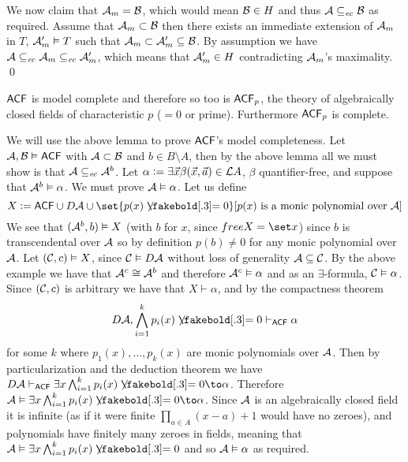 We now claim that ${\cal A}_m={\cal B}$, which would mean ${\cal B}\in H$ and thus ${\cal A}\subseteq_{\it ec}{\cal B}$ as required.
Assume that ${\cal A}_m\subset{\cal B}$ then there exists an immediate extension of ${\cal A}_m$ in $T$, ${\cal A}'_m\vDash T$ such that ${\cal A}_m\subset{\cal A}'_m\subseteq{\cal B}$.
By assumption we have ${\cal A}\subseteq_{\it ec}{\cal A}_m\subseteq_{\it ec}{\cal A}_m'$, which means that ${\cal A}_m'\in H$ contradicting ${\cal A}_m$'s maximality.
\qed

\bthrm

    ${\sf ACF}$ is model complete and therefore so too is ${\sf ACF}_p$, the theory of algebraically closed fields of characteristic $p$ ($=0$ or prime).
    Furthermore ${\sf ACF}_p$ is complete.

\ethrm

We will use the above lemma to prove ${\sf ACF}$'s model completeness.
Let ${\cal A},{\cal B}\vDash{\sf ACF}$ with ${\cal A}\subset{\cal B}$ and $b\in B\setminus A$, then by the above lemma all we must show is that ${\cal A}\subseteq_{\it ec}{\cal A}^b$.
Let $\alpha\coloneqq\exists\vec x\beta(\vec x,\vec a)\in{\cal L}A$, $\beta$ quantifier-free, and suppose that ${\cal A}^b\vDash\alpha$.
We must prove ${\cal A}\vDash\alpha$.
Let us define
$$ X \coloneqq {\sf ACF}\cup D{\cal A}\cup\set{p(x)\neqb0}[\hbox{$p(x)$ is a monic polynomial over ${\cal A}$}] $$
We see that $({\cal A}^b,b)\vDash X$ (with $b$ for $x$, since $\free X=\set x$) since $b$ is transcendental over ${\cal A}$ so by definition $p(b)\neq0$ for any monic polynomial over ${\cal A}$.
Let $({\cal C},c)\vDash X$, since ${\cal C}\vDash D{\cal A}$ without loss of generality ${\cal A}\subseteq{\cal C}$.
By the above example we have that ${\cal A}^c\cong{\cal A}^b$ and therefore ${\cal A}^c\vDash\alpha$ and as an $\exists$-formula, ${\cal C}\vDash\alpha$.
Since $({\cal C},c)$ is arbitrary we have that $X\vdash\alpha$, and by the compactness theorem
$$ D{\cal A},\bigwedge_{i=1}^k p_i(x)\neqb0\vdash_{{\sf ACF}}\alpha $$
for some $k$ where $p_1(x),\dots,p_k(x)$ are monic polynomials over ${\cal A}$.
Then by particularization and the deduction theorem we have $D{\cal A}\vdash_{{\sf ACF}}\exists x\bigwedge_{i=1}^k p_i(x)\neqb0\to\alpha$.
Therefore ${\cal A}\vDash\exists x\bigwedge_{i=1}^k p_i(x)\neqb0\to\alpha$.
Since ${\cal A}$ is an algebraically closed field it is infinite (as if it were finite $\prod_{a\in A}(x-a)+1$ would have no zeroes), and polynomials have finitely many zeroes in fields, meaning that
${\cal A}\vDash\exists x\bigwedge_{i=1}^k p_i(x)\neqb0$ and so ${\cal A}\vDash\alpha$ as required.

